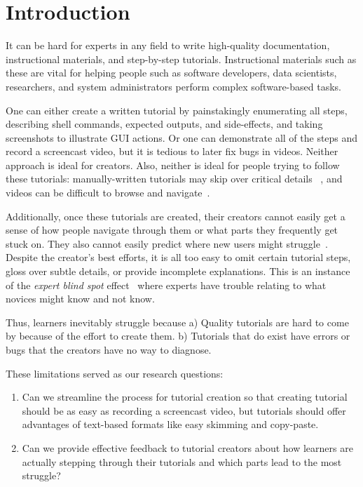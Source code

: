 \chapter{Introduction}
It can be hard for experts in any field to write high-quality
documentation, instructional materials, and step-by-step tutorials. Instructional materials such as these are vital for helping people such as
software developers, data scientists, researchers, and system
administrators perform complex software-based tasks. 

One can either create a written tutorial by painstakingly enumerating 
all steps, describing shell commands, expected outputs, and side-effects,
and taking screenshots to illustrate GUI actions. Or one can demonstrate
all of the steps and record a screencast video, but it is tedious
to later fix bugs in videos. Neither approach is ideal for
creators. Also, neither is ideal for people trying to follow these
tutorials: manually-written tutorials may skip over critical details
~\cite{Lafreniere2013}, and videos can be difficult to browse and
navigate~\cite{Krosnick2014,Pavel2014}.

Additionally, once these tutorials are created, their creators cannot
easily get a sense of how people navigate through them or what parts 
they frequently get stuck on. They also cannot easily predict where 
new users might struggle~\cite{Lafreniere2013}. Despite 
the creator's best efforts, it is all too easy to omit certain tutorial
steps, gloss over subtle details, or provide incomplete explanations.
This is an instance of the \emph{expert blind spot} effect~\cite{Nathan2001}
where experts have trouble relating to what novices might know and not
know.

Thus, learners inevitably struggle because a) Quality tutorials are hard to come by because of the effort to create them. b) Tutorials that do exist have errors or bugs that the creators have no way to diagnose.

These limitations served as our research questions:
\begin{enumerate}
    \item Can we streamline the process for tutorial creation so that creating tutorial should be as easy as recording a screencast video, but tutorials should offer advantages of text-based formats like easy skimming and copy-paste.
    \item Can we provide effective feedback to tutorial creators about how learners are actually stepping through their tutorials and which parts lead to the most struggle?
\end{enumerate}

